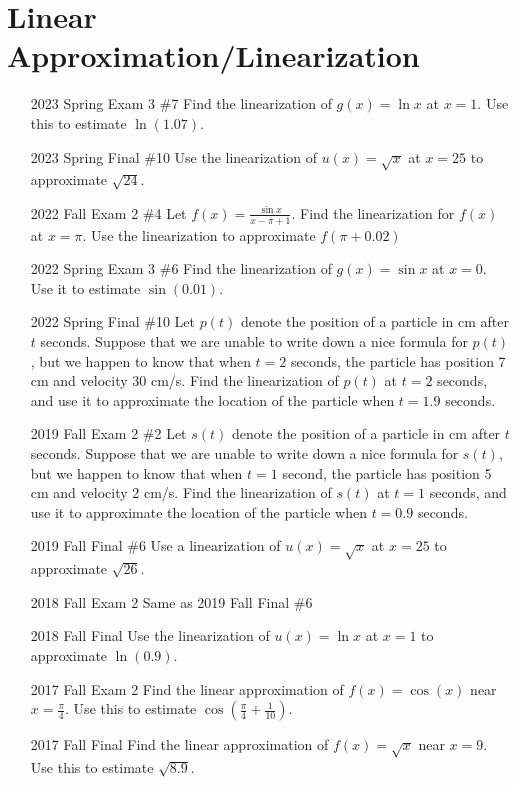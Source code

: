 \documentclass[10pt]{scrartcl}
\theoremstyle{definition}
\begin{document}
\section{Linear Approximation/Linearization}
\begin{enumerate}
\item [2023 Spring Exam 3 \#7] Find the linearization of $g(x) = \ln x$ at $x=1$. Use this to estimate $\ln(1.07)$.
\item [2023 Spring Final \#10] Use the linearization of $u(x) = \sqrt x$ at $x=25$ to approximate $\sqrt{24}$.
\item [2022 Fall Exam 2 \#4] Let $f(x) = \frac{\sin x}{x-\pi+1}$. Find the linearization for $f(x)$ at $x=\pi$. Use the linearization to approximate $f(\pi+0.02)$
\item [2022 Spring Exam 3 \#6] Find the linearization of $g(x) = \sin x$ at $x=0$. Use it to estimate $\sin(0.01)$.
\item [2022 Spring Final \#10] Let $p(t)$ denote the position of a particle in cm after $t$ seconds. Suppose that we are unable to write down a nice formula for $p(t)$, but we happen to know that when $t=2$ seconds, the particle has position 7 cm and velocity 30 cm/s. Find the linearization of $p(t)$ at $t=2$ seconds, and use it to approximate the location of the particle when $t=1.9$ seconds.
\item [2019 Fall Exam 2 \#2] Let $s(t)$ denote the position of a particle in cm after $t$ seconds. Suppose that we are unable to write down a nice formula for $s(t)$, but we happen to know that when $t=1$ second, the particle has position 5 cm and velocity 2 cm/s. Find the linearization of $s(t)$ at $t=1$ seconds, and use it to approximate the location of the particle when $t=0.9$ seconds.
\item [2019 Fall Final \#6] Use a linearization of $u(x) = \sqrt{x}$ at $x=25$ to approximate $\sqrt{26}$.
\item [2018 Fall Exam 2] Same as 2019 Fall Final \#6 %
\item [2018 Fall Final] Use the linearization of $u(x) = \ln x$ at $x = 1$ to approximate $\ln(0.9)$.
\item [2017 Fall Exam 2] Find the linear approximation of $f(x) = \cos(x)$ near $x = \frac{\pi}{4}$. Use this to estimate $\cos(\frac\pi4+\frac{1}{10})$.
\item [2017 Fall Final] Find the linear approximation of $f(x) = \sqrt{x}$ near $x = 9$. Use this to estimate $\sqrt{8.9}$.

\end{enumerate}
\end{document}
